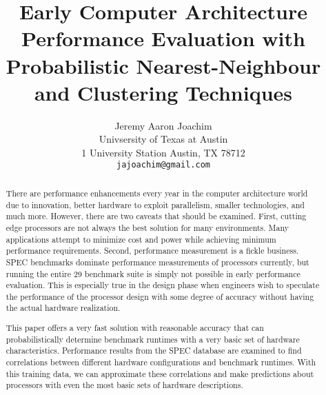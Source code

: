 \documentclass[10pt,twocolumn,letterpaper]{article}
\begin{document}
\title{Early Computer Architecture Performance Evaluation with Probabilistic Nearest-Neighbour and Clustering Techniques}

\author{Jeremy Aaron Joachim\\
Univsersity of Texas at Austin\\
1 University Station  Austin, TX 78712\\
{\tt\small jajoachim@gmail.com}
}

\maketitle

\begin{abstract}

There are performance enhancements every year in the computer architecture world due to innovation, better hardware to exploit parallelism, smaller technologies, and much more.
However, there are two caveats that should be examined.
First, cutting edge processors are not always the best solution for many environments.
Many applications attempt to minimize cost and power while achieving minimum performance requirements.
Second, performance measurement is a fickle business.
SPEC benchmarks dominate performance measurements of processors currently, but running the entire 29 benchmark suite is simply not possible in early performance evaluation.
This is especially true in the design phase when engineers wish to speculate the performance of the processor design with some degree of accuracy without having the actual hardware realization.

This paper offers a very fast solution with reasonable accuracy that can probabilistically determine benchmark runtimes with a very basic set of hardware characteristics.
Performance results from the SPEC database are examined to find correlations between different hardware configurations and benchmark runtimes.
With this training data, we can approximate these correlations and make predictions about processors with even the most basic sets of hardware descriptions.

\end{abstract}
\end{document}

